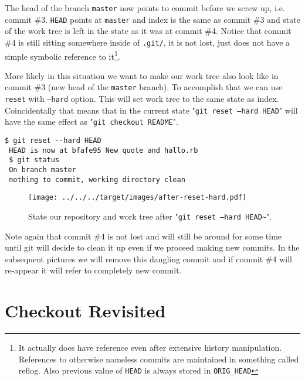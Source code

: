 \documentclass{article}
\theoremstyle{definition}
\begin{document}
        The head of the branch \texttt{master} now points to commit before we screw up, i.e.
        commit \#3. \texttt{HEAD} points at \texttt{master} and index is the same as commit \#3 and state of the work
        tree is left in the state as it was at commit \#4. Notice that commit \#4 is still sitting somewhere inside of
        \texttt{.git/}, it is not lost, just does not have a simple symbolic reference to it\footnote{It actually does
        have reference even after extensive history manipulation. References to otherwise nameless commits are
        maintained in something called reflog. Also previous value of \texttt{HEAD} is always stored
        in \texttt{ORIG\_HEAD}}.

        More likely in this situation we want to make our work tree also look like in commit \#3 (new head of
        the \texttt{master} branch). To accomplish that we can use \texttt{reset} with \texttt{--hard} option. This
        will set work tree to the same state as index. Coincidentally that means that in the current
        state "\texttt{git reset --hard HEAD}" will have the same effect as "\texttt{git checkout README}".

        \begin{Verbatim}[frame=single]
 $ git reset --hard HEAD
 HEAD is now at bfafe95 New quote and hallo.rb
 $ git status
 On branch master
 nothing to commit, working directory clean
        \end{Verbatim}

        \begin{figure}[h]
        \centering\texttt{[image: ../../../target/images/after-reset-hard.pdf]}
        \caption{State our repository and work tree after "\texttt{git reset --hard HEAD\textasciitilde}".\label{fig:after-reset-hard}}
        \end{figure}

        \noindent Note again that commit \#4 is not lost and will still be around for some time until git will decide
        to clean it up even if we proceed making new commits. In the subsequent pictures we will remove this dangling
        commit and if commit \#4 will re-appear it will refer to completely new commit.

        \section{Checkout Revisited}
\end{document}
